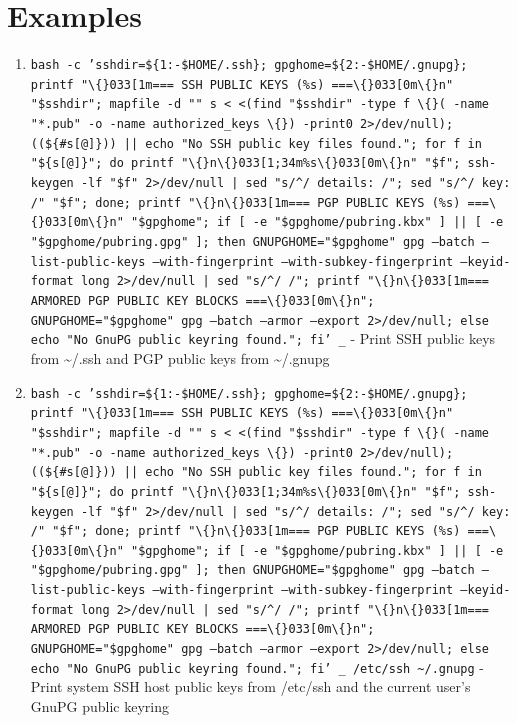\documentclass[openany]{book}
\begin{document}
\section*{Examples}
\begin{enumerate}
  \item \texttt{bash -c 'sshdir=\$\{1:-\$HOME/.ssh\}; gpghome=\$\{2:-\$HOME/.gnupg\}; printf "\textbackslash\{\}033[1m=== SSH PUBLIC KEYS (\%s) ===\textbackslash\{\}033[0m\textbackslash\{\}n" "\$sshdir"; mapfile -d "" s < <(find "\$sshdir" -type f \textbackslash\{\}( -name "*.pub" -o -name authorized\_keys \textbackslash\{\}) -print0 2>/dev/null); ((\$\{\#s[@]\})) || echo "No SSH public key files found."; for f in "\$\{s[@]\}"; do printf "\textbackslash\{\}n\textbackslash\{\}033[1;34m\%s\textbackslash\{\}033[0m\textbackslash\{\}n" "\$f"; ssh-keygen -lf "\$f" 2>/dev/null | sed "s/\textasciicircum{}/  details: /"; sed "s/\textasciicircum{}/  key: /" "\$f"; done; printf "\textbackslash\{\}n\textbackslash\{\}033[1m=== PGP PUBLIC KEYS (\%s) ===\textbackslash\{\}033[0m\textbackslash\{\}n" "\$gpghome"; if [ -e "\$gpghome/pubring.kbx" ] || [ -e "\$gpghome/pubring.gpg" ]; then GNUPGHOME="\$gpghome" gpg --batch --list-public-keys --with-fingerprint --with-subkey-fingerprint --keyid-format long 2>/dev/null | sed "s/\textasciicircum{}/  /"; printf "\textbackslash\{\}n\textbackslash\{\}033[1m=== ARMORED PGP PUBLIC KEY BLOCKS ===\textbackslash\{\}033[0m\textbackslash\{\}n"; GNUPGHOME="\$gpghome" gpg --batch --armor --export 2>/dev/null; else echo "No GnuPG public keyring found."; fi' \_} - Print SSH public keys from \textasciitilde{}/.ssh and PGP public keys from \textasciitilde{}/.gnupg
  \item \texttt{bash -c 'sshdir=\$\{1:-\$HOME/.ssh\}; gpghome=\$\{2:-\$HOME/.gnupg\}; printf "\textbackslash\{\}033[1m=== SSH PUBLIC KEYS (\%s) ===\textbackslash\{\}033[0m\textbackslash\{\}n" "\$sshdir"; mapfile -d "" s < <(find "\$sshdir" -type f \textbackslash\{\}( -name "*.pub" -o -name authorized\_keys \textbackslash\{\}) -print0 2>/dev/null); ((\$\{\#s[@]\})) || echo "No SSH public key files found."; for f in "\$\{s[@]\}"; do printf "\textbackslash\{\}n\textbackslash\{\}033[1;34m\%s\textbackslash\{\}033[0m\textbackslash\{\}n" "\$f"; ssh-keygen -lf "\$f" 2>/dev/null | sed "s/\textasciicircum{}/  details: /"; sed "s/\textasciicircum{}/  key: /" "\$f"; done; printf "\textbackslash\{\}n\textbackslash\{\}033[1m=== PGP PUBLIC KEYS (\%s) ===\textbackslash\{\}033[0m\textbackslash\{\}n" "\$gpghome"; if [ -e "\$gpghome/pubring.kbx" ] || [ -e "\$gpghome/pubring.gpg" ]; then GNUPGHOME="\$gpghome" gpg --batch --list-public-keys --with-fingerprint --with-subkey-fingerprint --keyid-format long 2>/dev/null | sed "s/\textasciicircum{}/  /"; printf "\textbackslash\{\}n\textbackslash\{\}033[1m=== ARMORED PGP PUBLIC KEY BLOCKS ===\textbackslash\{\}033[0m\textbackslash\{\}n"; GNUPGHOME="\$gpghome" gpg --batch --armor --export 2>/dev/null; else echo "No GnuPG public keyring found."; fi' \_ /etc/ssh \textasciitilde{}/.gnupg} - Print system SSH host public keys from /etc/ssh and the current user's GnuPG public keyring
\end{enumerate}
\end{document}
